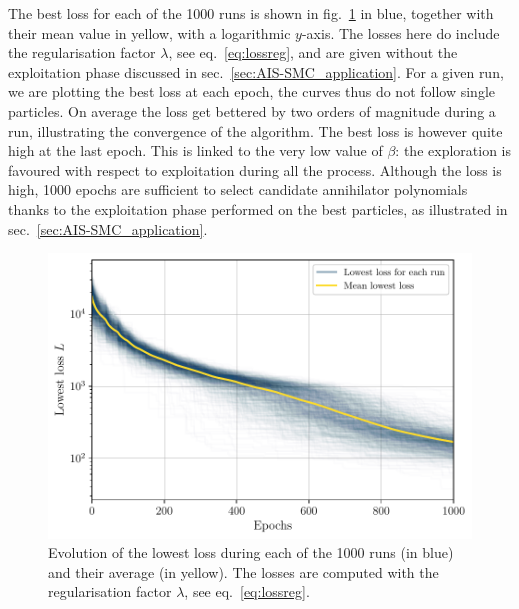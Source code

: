 \documentclass[11pt,a4paper]{article}
\begin{document}
	The best loss for each of the 1000 runs is shown in fig.~\ref{fig:lossallASMC} in blue, together with their mean value in yellow, with a logarithmic $y$-axis. The losses here do include the regularisation factor $\lambda$, see eq.~\eqref{eq:lossreg}, and are given without the exploitation phase discussed in sec.~\ref{sec:AIS-SMC_application}. For a given run, we are plotting the best loss at each epoch, the curves thus do not follow single particles. On average the loss get bettered by two orders of magnitude during a run, illustrating the convergence of the algorithm. The best loss is however quite high at the last epoch. This is linked to the very low value of $\beta$: the exploration is favoured with respect to exploitation during all the process. Although the loss is high, 1000 epochs are sufficient to select candidate annihilator polynomials thanks to the exploitation phase performed on the best particles, as illustrated in sec.~\ref{sec:AIS-SMC_application}.

	\begin{figure}
		\centering
		\includegraphics[scale=0.75]{Figures/Loss_all_ASMC_1000runs_13.pdf}
		\caption{Evolution of the lowest loss during each of the 1000 runs (in blue) and their average (in yellow). The losses are computed with the regularisation factor $\lambda$, see eq.~\eqref{eq:lossreg}.}
		\label{fig:lossallASMC}
	\end{figure}


\end{document}
